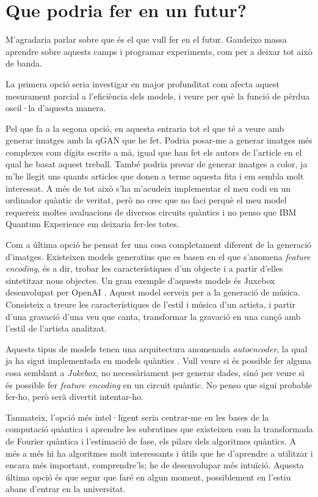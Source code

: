 \chapter{Que podria fer en un futur?}
M'agradaria parlar sobre que és el que vull fer en el futur. Gaudeixo massa aprendre sobre aquests camps i programar experiments, com per a deixar tot això de banda.

La primera opció seria investigar en major profunditat com afecta aquest mesurament parcial a l'eficiència dels models, i veure per què la funció de pèrdua oscil·la d'aquesta manera.

Pel que fa a la segona opció, en aquesta entraria tot el que té a veure amb generar imatges amb la qGAN que he fet. Podria posar-me a generar imatges més complexes com dígits escrits a mà, igual que han fet els autors de l'article en el qual he basat aquest treball. També podria provar de generar imatges a color, ja m'he llegit uns quants articles que donen a terme aquesta fita i em sembla molt interessat. A més de tot això s'ha m'acudeix implementar el meu codi en un ordinador quàntic de veritat, però no crec que no faci perquè el meu model requereix moltes avaluacions de diversos circuits quàntics i no penso que IBM Quantum Experience em deixaria fer-les totes.

Com a última opció he pensat fer una cosa completament diferent de la generació d'imatges. Existeixen models generatius que es basen en el que s'anomena \textit{feature encoding}, és a dir, trobar les característiques d'un objecte i a partir d'elles sintetitzar nous objectes. Un gran exemple d'aquests models és Juxebox desenvolupat per OpenAI \cite{jukebox}. Aquest model serveix per a la generació de música. Consisteix a treure les característiques de l'estil i música d'un artista, i partir d'una gravació d'una veu que canta, transformar la gravació en una cançó amb l'estil de l'artista analitzat.

Aquests tipus de models tenen una arquitectura anomenada \textit{autoencoder}, la qual ja ha sigut implementada en models quàntics \cite{q_autoencoder}. Vull veure si és possible fer alguna cosa semblant a \textit{Jukebox}, no necessàriament per generar dades, sinó per veure si és possible fer \textit{feature encoding} en un circuit quàntic. No penso que sigui probable fer-ho, però serà divertit intentar-ho.

Tanmateix, l'opció més intel·ligent seria centrar-me en les bases de la computació quàntica i aprendre les subrutines que existeixen com la transformada de Fourier quàntica i l'estimació de fase, els pilars dels algoritmes quàntics. A més a més hi ha algoritmes molt interessants i útils que he d'aprendre a utilitzar i encara més important, comprendre'ls; he de desenvolupar més intuïció. Aquesta última opció és que segur que faré en algun moment, possiblement en l'estiu abans d'entrar en la universitat.

